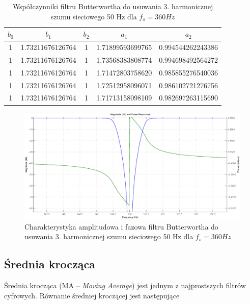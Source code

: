 \begin{table}[H]
\begin{center}
\begin{tabular}{|c|c|c|c|c|}
\hline
        $b_0$ & $b_1$ & $b_2$ & $a_1$ & $a_2$ \\
\hline
        1& 1.73211676126764& 1&        1.71899593699765& 0.994544262243386\\
\hline
        1& 1.73211676126764& 1&        1.73568383808774& 0.994698492564272\\
\hline
        1& 1.73211676126764& 1&        1.71472803758620& 0.985855276540036\\
\hline
        1& 1.73211676126764& 1&        1.72512958096071& 0.986102721276756\\
\hline
        1& 1.73211676126764& 1&        1.71713158098109& 0.982697263115690\\
\hline
\end{tabular} 
\caption{Współczynniki filtru Butterwortha do usuwania 3. harmonicznej szumu sieciowego 50 Hz dla $f_s=360 Hz$}
\label{tab:ac_3rd_360}
\end{center}
\end{table}

\begin{figure}[H]
\centering
	\includegraphics[width=\textwidth]{ECG_BASELINE/figures/3rd_harm_360.eps}
\caption{Charakterystyka amplitudowa i fazowa filtru Butterwortha do usuwania 3. harmonicznej szumu sieciowego 50 Hz dla $f_s=360 Hz$}
\label{fig:3rd_360}
\end{figure}

\subsection{Średnia krocząca}

Średnia krocząca (MA -- \emph{Moving Average}) jest jednym z najprostszych filtrów cyfrowych. Równanie średniej kroczącej jest następujące

